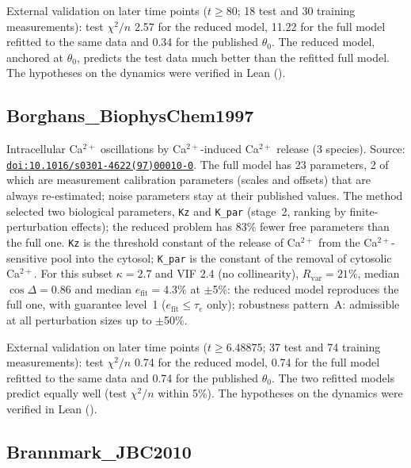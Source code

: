External validation on later time points ($t\ge80$; 18 test and 30 training measurements): test $\chi^2/n$ 2.57 for the reduced model, 11.22 for the full model refitted to the same data and 0.34 for the published $\theta_0$. The reduced model, anchored at $\theta_0$, predicts the test data much better than the refitted full model. The hypotheses on the dynamics were verified in Lean ().

\subsection*{Borghans\_BiophysChem1997}

Intracellular Ca$^{2+}$ oscillations by Ca$^{2+}$-induced Ca$^{2+}$ release (3 species). Source: \href{https://doi.org/10.1016/s0301-4622(97)00010-0}{\nolinkurl{doi:10.1016/s0301-4622(97)00010-0}}. The full model has 23 parameters, 2 of which are measurement calibration parameters (scales and offsets) that are always re-estimated; noise parameters stay at their published values. The method selected two biological parameters, \texttt{Kz} and \texttt{K\_par} (stage~2, ranking by finite-perturbation effects); the reduced problem has 83\% fewer free parameters than the full one. \texttt{Kz} is the threshold constant of the release of Ca$^{2+}$ from the Ca$^{2+}$-sensitive pool into the cytosol; \texttt{K\_par} is the constant of the removal of cytosolic Ca$^{2+}$. For this subset $\kappa=2.7$ and VIF $2.4$ (no collinearity), $R_{\mathrm{var}}=21\%$, median $\cos\Delta=0.86$ and median $e_{\mathrm{fit}}=4.3\%$ at $\pm$5\%: the reduced model reproduces the full one, with guarantee level~1 ($e_{\mathrm{fit}}\le\tau_e$ only); robustness pattern~A: admissible at all perturbation sizes up to $\pm$50\%.

External validation on later time points ($t\ge6.48875$; 37 test and 74 training measurements): test $\chi^2/n$ 0.74 for the reduced model, 0.74 for the full model refitted to the same data and 0.74 for the published $\theta_0$. The two refitted models predict equally well (test $\chi^2/n$ within 5\%). The hypotheses on the dynamics were verified in Lean ().

\subsection*{Brannmark\_JBC2010}

